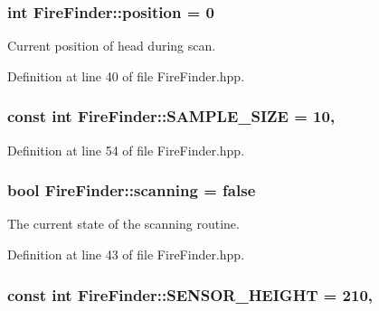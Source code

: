 \hypertarget{classFireFinder_a40e204a2807939b3195024f14a9278fc}{
\subsubsection[{position}]{\setlength{\rightskip}{0pt plus 5cm}int Fire\-Finder\-::position = 0\hspace{0.3cm}{\ttfamily [private]}}}\label{classFireFinder_a40e204a2807939b3195024f14a9278fc}


Current position of head during scan. 



Definition at line 40 of file Fire\-Finder.\-hpp.

\hypertarget{classFireFinder_a2136ca4e2438b84b0f4f3864697d51b1}{
\subsubsection[{S\-A\-M\-P\-L\-E\-\_\-\-S\-I\-Z\-E}]{\setlength{\rightskip}{0pt plus 5cm}const int Fire\-Finder\-::\-S\-A\-M\-P\-L\-E\-\_\-\-S\-I\-Z\-E = 10\hspace{0.3cm}{\ttfamily [static]}, {\ttfamily [private]}}}\label{classFireFinder_a2136ca4e2438b84b0f4f3864697d51b1}


Definition at line 54 of file Fire\-Finder.\-hpp.

\hypertarget{classFireFinder_aec1a3ae4b80847a907898601c64386cb}{
\subsubsection[{scanning}]{\setlength{\rightskip}{0pt plus 5cm}bool Fire\-Finder\-::scanning = false\hspace{0.3cm}{\ttfamily [private]}}}\label{classFireFinder_aec1a3ae4b80847a907898601c64386cb}


The current state of the scanning routine. 



Definition at line 43 of file Fire\-Finder.\-hpp.

\hypertarget{classFireFinder_ab145c886fc3edcc215a5673bf4874b13}{
\subsubsection[{S\-E\-N\-S\-O\-R\-\_\-\-H\-E\-I\-G\-H\-T}]{\setlength{\rightskip}{0pt plus 5cm}const int Fire\-Finder\-::\-S\-E\-N\-S\-O\-R\-\_\-\-H\-E\-I\-G\-H\-T = 210\hspace{0.3cm}{\ttfamily [static]}, {\ttfamily [private]}}}\label{classFireFinder_ab145c886fc3edcc215a5673bf4874b13}


